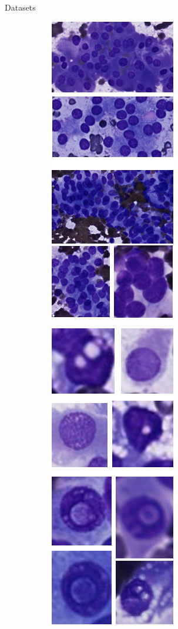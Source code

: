 \documentclass{beamer}
\begin{document}
\begin{frame}{Datasets}
\begin{figure}
    \begin{subfigure}{0.1\textwidth}\includegraphics[scale=0.35]{images/illus_patterns.png}\end{subfigure}
    \begin{subfigure}{0.1\textwidth}\includegraphics[scale=0.35]{images/illus_cells.png}\end{subfigure}

\end{figure}
\end{frame}
\end{document}

